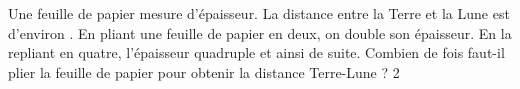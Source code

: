 \documentclass[a4paper,11pt]{report}
\begin{document}
\begin{exo}{
Une feuille de papier mesure  d’épaisseur. La distance entre la Terre et la Lune est d’environ .
En pliant une feuille de papier en deux, on double son épaisseur. En la repliant en quatre,
l’épaisseur quadruple et ainsi de suite. Combien de fois faut-il plier la feuille de papier pour
obtenir la distance Terre-Lune ?
}{2}
\end{exo}
\end{document}
